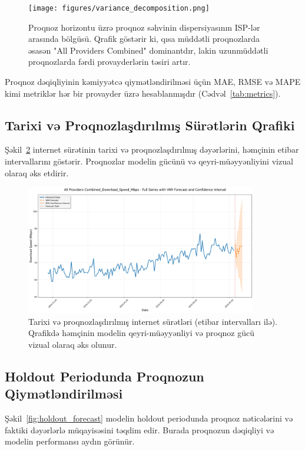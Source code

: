 \documentclass[12pt,a4paper]{article}
\begin{document}
\begin{figure}[h!]
    \centering
    \texttt{[image: figures/variance\_decomposition.png]}
    \caption{Proqnoz horizontu üzrə proqnoz səhvinin dispersiyasının ISP-lər arasında bölgüsü. Qrafik göstərir ki, qısa müddətli proqnozlarda əsasən "All Providers Combined" dominantdır, lakin uzunmüddətli proqnozlarda fərdi provayderlərin təsiri artır.}
    \label{fig:variance_decomposition}
\end{figure}

Proqnoz dəqiqliyinin kəmiyyətcə qiymətləndirilməsi üçün MAE, RMSE və MAPE kimi metriklər hər bir provayder üzrə hesablanmışdır (Cədvəl~\ref{tab:metrics}).

\subsection{Tarixi və Proqnozlaşdırılmış Sürətlərin Qrafiki}
Şəkil~\ref{fig:full_series_forecast} internet sürətinin tarixi və proqnozlaşdırılmış dəyərlərini, həmçinin etibar intervallarını göstərir. Proqnozlar modelin gücünü və qeyri-müəyyənliyini vizual olaraq əks etdirir.

\begin{figure}[h!]
    \centering
    \includegraphics[width=0.9\textwidth]{figures/full_series_with_forecast.png}
    \caption{Tarixi və proqnozlaşdırılmış internet sürətləri (etibar intervalları ilə). Qrafikdə həmçinin modelin qeyri-müəyyənliyi və proqnoz gücü vizual olaraq əks olunur.} 
    \label{fig:full_series_forecast}
\end{figure}

\subsection{Holdout Periodunda Proqnozun Qiymətləndirilməsi}
Şəkil~\ref{fig:holdout_forecast} modelin holdout periodunda proqnoz nəticələrini və faktiki dəyərlərlə müqayisəsini təqdim edir. Burada proqnozun dəqiqliyi və modelin performansı aydın görünür.
\end{document}
